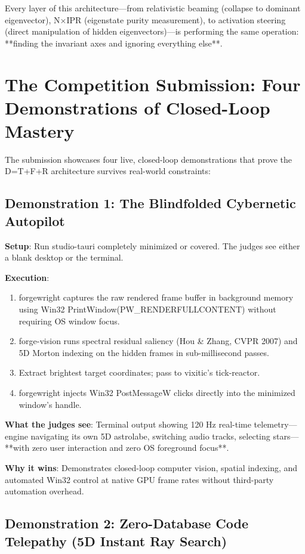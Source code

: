 \documentclass[11pt,oneside]{article}
\theoremstyle{definition}
\begin{document}
Every layer of this architecture—from relativistic beaming (collapse to dominant eigenvector), N\ensuremath{\times}IPR (eigenstate purity measurement), to activation steering (direct manipulation of hidden eigenvectors)—is performing the same operation: **finding the invariant axes and ignoring everything else**.

\section{The Competition Submission: Four Demonstrations of Closed-Loop Mastery}

The submission showcases four live, closed-loop demonstrations that prove the D=T+F+R architecture survives real-world constraints:

\subsection{Demonstration 1: The Blindfolded Cybernetic Autopilot}

\textbf{Setup}: Run studio-tauri completely minimized or covered. The judges see either a blank desktop or the terminal.

\textbf{Execution}:
\begin{enumerate}
  \item forgewright captures the raw rendered frame buffer in background memory using Win32 PrintWindow(PW\_RENDERFULLCONTENT) without requiring OS window focus.
  \item forge-vision runs spectral residual saliency (Hou \& Zhang, CVPR 2007) and 5D Morton indexing on the hidden frames in sub-millisecond passes.
  \item Extract brightest target coordinates; pass to vixitic's tick-reactor.
  \item forgewright injects Win32 PostMessageW clicks directly into the minimized window's handle.
\end{enumerate}

\textbf{What the judges see}: Terminal output showing 120 Hz real-time telemetry—engine navigating its own 5D astrolabe, switching audio tracks, selecting stars—**with zero user interaction and zero OS foreground focus**.

\textbf{Why it wins}: Demonstrates closed-loop computer vision, spatial indexing, and automated Win32 control at native GPU frame rates without third-party automation overhead.

\subsection{Demonstration 2: Zero-Database Code Telepathy (5D Instant Ray Search)}
\end{document}
